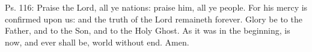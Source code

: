 \begin{enpars}\noindent Ps. 116: Praise the Lord, all ye nations: praise him, all ye people. For his mercy is confirmed upon us: and the truth of the Lord remaineth forever. Glory be to the Father, and to the Son, and to the Holy Ghost. As it was in the beginning, is now, and ever shall be, world without end. Amen.\end{enpars}